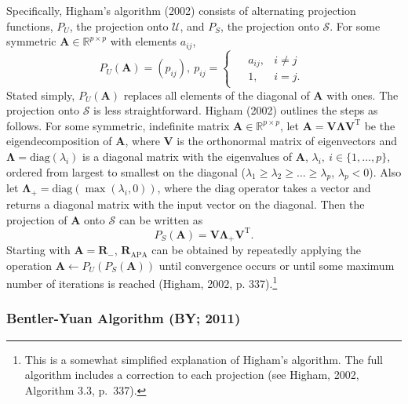 \documentclass[
  english,
  man]{apa6}
\begin{document}
Specifically, Higham's algorithm (2002) consists of alternating projection functions, \(P_U\), the projection onto \(\mathcal{U}\), and \(P_S\), the projection onto \(\mathcal{S}\). For some symmetric \(\mathbf{A} \in \mathbb{R}^{p \times p}\) with elements \(a_{ij}\),
\begin{equation}
P_U(\mathbf{A}) = (p_{ij}), \: p_{ij} = 
\begin{cases}
\begin{aligned}
&a_{ij}, &i \neq j \\
&1, &i = j.
\end{aligned}
\end{cases}
\label{eq:proj-U}
\end{equation}
Stated simply, \(P_U(\mathbf{A})\) replaces all elements of the diagonal of \(\mathbf{A}\) with ones. The projection onto \(\mathcal{S}\) is less straightforward. Higham (2002) outlines the steps as follows. For some symmetric, indefinite matrix \(\mathbf{A} \in \mathbb{R}^{p \times p}\), let \(\mathbf{A} = \mathbf{V} \mathbf{\Lambda} \mathbf{V}^{\textrm{T}}\) be the eigendecomposition of \(\mathbf{A}\), where \(\mathbf{V}\) is the orthonormal matrix of eigenvectors and \(\mathbf{\Lambda} = \textrm{diag}(\lambda_i)\) is a diagonal matrix with the eigenvalues of \(\mathbf{A}\), \(\lambda_i, \: i \in \{1, \dots, p \}\), ordered from largest to smallest on the diagonal (\(\lambda_1 \geq \lambda_2 \geq \dots \geq \lambda_p\), \(\lambda_p < 0\)). Also let \(\mathbf{\Lambda}_+ = \textrm{diag}(\max(\lambda_i, 0))\), where the \(\textrm{diag}\) operator takes a vector and returns a diagonal matrix with the input vector on the diagonal. Then the projection of \(\mathbf{A}\) onto \(\mathcal{S}\) can be written as
\begin{equation}
P_S(\mathbf{A}) = \mathbf{V} \mathbf{\Lambda_+} \mathbf{V}^{\textrm{T}}.
\label{eq:proj-S}
\end{equation}
Starting with \(\mathbf{A} = \mathbf{R}_{-}\), \(\mathbf{R}_{\textrm{APA}}\) can be obtained by repeatedly applying the operation \(\mathbf{A} \leftarrow P_U(P_S(\mathbf{A}))\) until convergence occurs or until some maximum number of iterations is reached (Higham, 2002, p. 337).\footnote{This is a somewhat simplified explanation of Higham's algorithm. The full algorithm includes a correction to each projection (see Higham, 2002, Algorithm 3.3, p.~337).}

\hypertarget{bentler-yuan-algorithm-by-2011}{%
\subsubsection{Bentler-Yuan Algorithm (BY; 2011)}\label{bentler-yuan-algorithm-by-2011}}
\end{document}
